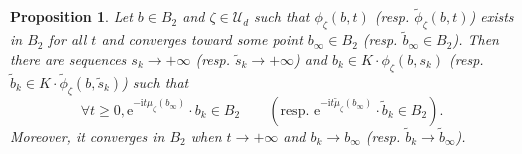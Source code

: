 \documentclass{article}
\newtheorem{proposition}[theorem]{Proposition}
\theoremstyle{remark}
\theoremstyle{definition}
\renewcommand{\i}{\boldsymbol{\mathrm{i}}}
\newcommand{\e}{\boldsymbol{\mathrm{e}}}
\newcommand{\mU}{\mathcal{U}}
\renewcommand{\geq}{\geqslant}
\begin{document}
\begin{proposition}\label{PRO:Existence arc équivariant instable}
    Let $b \in B_2$ and $\zeta \in \mU_d$ such that $\phi_\zeta(b,t)$ (resp. $\tilde{\phi}_\zeta(b,t)$) exists in $B_2$ for all $t$ and converges toward some point $b_\infty \in B_2$ (resp. $\tilde{b}_\infty \in B_2$). Then there are sequences $s_k \rightarrow +\infty$ (resp. $\tilde{s}_k \rightarrow +\infty$) and $b_k \in K \cdot \phi_\zeta(b,s_k)$ (resp. $\tilde{b}_k \in K \cdot \tilde{\phi}_\zeta(b,\tilde{s}_k)$) such that
    $$
    \forall t \geq 0, \e^{-\i t\mu_\zeta(b_\infty)} \cdot b_k \in B_2 \qquad \left(\textrm{resp. } \e^{-\i t\tilde{\mu}_\zeta(b_\infty)} \cdot \tilde{b}_k \in B_2\right).
    $$
    Moreover, it converges in $B_2$ when $t \rightarrow +\infty$ and $b_k \rightarrow b_\infty$ (resp. $\tilde{b}_k \rightarrow \tilde{b}_\infty$).
\end{proposition}
\end{document}
